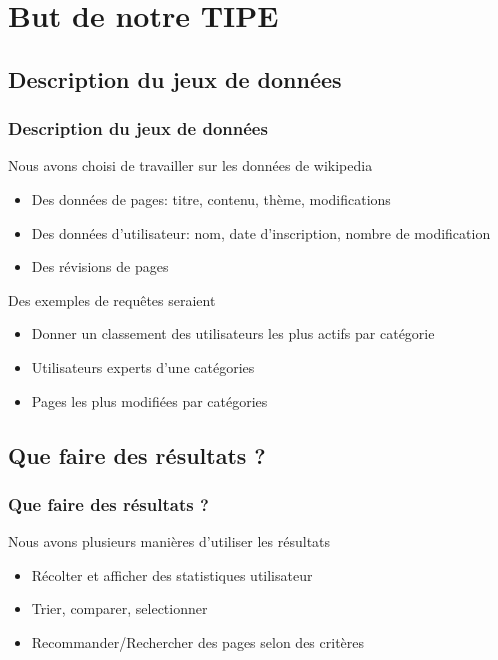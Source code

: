 \documentclass[a4paper,12pt]{beamer}
\begin{document}
\section{But de notre TIPE}

\subsection{Description du jeux de données}

\begin{frame}
    \frametitle{Description du jeux de données} 

  \begin{block}{Nous avons choisi de travailler sur les données de wikipedia}
    \begin{itemize}
        \item  Des données de pages: titre, contenu, thème, modifications
        \item  Des données d'utilisateur: nom, date d'inscription, nombre de modification
        \item  Des révisions de pages
    \end{itemize}
    \end{block}
 \begin{block}{Des exemples de requêtes seraient}
    \begin{itemize}
        \item  Donner un classement des utilisateurs les plus actifs par catégorie
        \item  Utilisateurs experts d'une catégories
        \item  Pages les plus modifiées par catégories
    \end{itemize}
    \end{block}

\end{frame}


\subsection{Que faire des résultats ?}

\begin{frame}
    \frametitle{Que faire des résultats ?}

  \begin{block}{Nous avons plusieurs manières d'utiliser les résultats}
    \begin{itemize}
        \item  Récolter et afficher des statistiques utilisateur
        \item  Trier, comparer, selectionner
        \item  Recommander/Rechercher des pages selon des critères
    \end{itemize}
    \end{block}
\end{frame}
\end{document}
